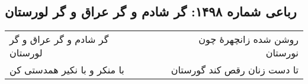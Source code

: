 \begin{center}
\section*{رباعی شماره ۱۴۹۸: گر شادم و گر عراق و گر لورستان}
\label{sec:1498}
\begin{longtable}{l p{0.5cm} r}
گر شادم و گر عراق و گر لورستان
&&
روشن شده زانچهرهٔ چون نورستان
\\
با منکر و با نکیر همدستی کن
&&
تا دست زنان رقص کند گورستان
\\
\end{longtable}
\end{center}
